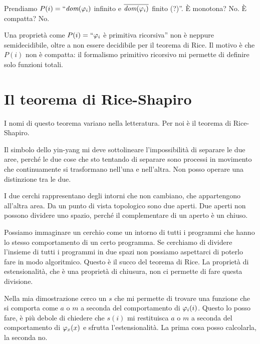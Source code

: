 Prendiamo $P(i) = ``\textit{dom}(\varphi_{i})$ infinito e $\overline{\textit{dom}(\varphi_{i})}$ finito (?)''. È monotona? No. È
compatta? No.

Una proprietà come $P(i) = `` \varphi_{i}$ è primitiva ricorsiva'' non è neppure semidecidibile, oltre a non
essere decidibile per il teorema di Rice. Il motivo è che $P(i)$ non è compatta: il formalismo
primitivo ricorsivo mi permette di definire solo funzioni totali.

\section{Il teorema di Rice-Shapiro}

I nomi di questo teorema variano nella letteratura. Per noi è il teorema di Rice-Shapiro.

Il simbolo dello yin-yang mi deve sottolineare l'impossibilità di separare le due aree, perché le
due cose che sto tentando di separare sono processi in movimento che continuamente si trasformano
nell'una e nell'altra. Non posso operare una distinzione tra le due.

I due cerchi rappresentano degli intorni che non cambiano, che appartengono all'altra area. Da un
punto di vista topologico sono due aperti. Due aperti non possono dividere uno spazio, perché il
complementare di un aperto è un chiuso.

Possiamo immaginare un cerchio come un intorno di tutti i programmi che hanno lo stesso
comportamento di un certo programma. Se cerchiamo di dividere l'insieme di tutti i programmi in due
spazi non possiamo aspettarci di poterlo fare in modo algoritmico. Questo è il succo del teorema
di Rice. La proprietà di estensionalità, che è una proprietà di chiusura, non ci permette di
fare questa divisione.

Nella mia dimostrazione cerco un $s$ che mi permette di trovare una funzione che si comporta come
$a$ o $m$ a seconda del comportamento di $\varphi_{i}(i)$. Questo lo posso fare, è più debole di
chiedere che $s(i)$ mi restituisca $a$ o $m$ a seconda del comportamento di $\varphi_{x}(x)$ e sfrutta
l'estensionalità. La prima cosa posso calcolarla, la seconda no.

